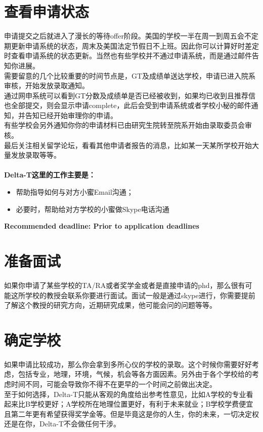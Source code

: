 \documentclass{article}
\begin{document}
\section{查看申请状态}
申请提交之后就进入了漫长的等待offer阶段。美国的学校一半在周一到周五会不定期更新申请系统的状态，周末及美国法定节假日不上班。因此你可以计算好时差定时查看申请系统的状态更新。当然也有些学校并不通过申请系统，而是通过邮件告知你进展。\\
\indent 需要留意的几个比较重要的时间节点是，GT及成绩单送达学校，申请已进入院系审核，开始发放录取通知。\\
\indent 通过网申系统可以看到GT分数及成绩单是否已经被收到，如果均已收到且推荐信也全部提交，则会显示申请complete，此后会受到申请系统或者学校小秘的邮件通知，并告知已经开始审理你的申请。\\
\indent 有些学校会另外通知你你的申请材料已由研究生院转至院系开始由录取委员会审核。\\
\indent 最后关注相关留学论坛，看看其他申请者报告的消息，比如某一天某所学校开始大量发放录取等等。\\
\\
\indent\textcolor{colorname2}{\bf Delta-T这里的工作主要是：}
\begin{itemize}
\item{帮助指导如何与对方小蜜Email沟通；}
\item{必要时，帮助给对方学校的小蜜做Skype电话沟通}
\end{itemize}
\textbf{Recommended deadline: Prior to application deadlines}


\section{准备面试}
如果你申请了某些学校的TA/RA或者奖学金或者是直接申请的phd，那么很有可能这所学校的教授会联系你要进行面试。面试一般是通过skype进行，你需要提前了解这个教授的研究方向，近期研究成果，他可能会问的问题等等。


\section{确定学校}
如果申请比较成功，那么你会拿到多所心仪的学校的录取。这个时候你需要好好考虑，包括专业，地理，环境，气候，机会等各方面因素。另外由于各个学校给的考虑时间不同，可能会导致你不得不在更早的一个时间之前做出决定。\\
\indent 至于如何选择，Delta-T只能从客观的角度给出参考性意见，比如A学校的专业看起来比B学校更好；A学校所在地理位置更好，有利于未来就业；B学校学费便宜且第二年更有希望获得奖学金等。但是毕竟这是你的人生，你的未来，一切决定权还是在你，Delta-T不会做任何干涉。
\end{document}
